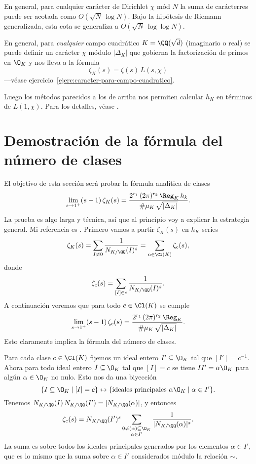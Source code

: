 \begin{comentario}
  En general, para cualquier carácter de Dirichlet $\chi$ mód $N$ la suma de
  carácterres puede ser acotada como $O (\sqrt{N}\,\log N)$. Bajo la hipótesis
  de Riemann generalizada, esta cota se generaliza a
  $O (\sqrt{N}\,\log\log N)$.
\end{comentario}

\begin{comentario}
  En general, para \emph{cualquier} campo cuadrático $K = \QQ (\sqrt{d})$
  (imaginario o real) se puede definir un carácter $\chi$ módulo $|\Delta_K|$
  que gobierna la factorización de primos en $\O_K$ y nos lleva a la fórmula
  $$\zeta_K (s) = \zeta (s) \, L (s,\chi)$$
  ---véase ejercicio~\ref{ejerc:caracter-para-campo-cuadratico}.

  Luego los métodos parecidos a los de arriba nos permiten calcular $h_K$
  en términos de $L (1,\chi)$. Para los detalles, véase
  \cite[Chapter~5]{Borevich-Shafarevich}.
\end{comentario}


\section{Demostración de la fórmula del número de clases}

El objetivo de esta sección será probar la fórmula analítica de clases
\[ \lim_{s \to 1^+} (s - 1)\,\zeta_K (s) =
   \frac{2^{r_1}\,(2\pi)^{r_2}\,\Reg_K\,h_k}{\#\mu_K\,\sqrt{|\Delta_K|}}. \]
La prueba es algo larga y técnica, así que al principio voy a explicar
la estrategia general. Mi referencia es \cite{Borevich-Shafarevich}.
Primero vamos a partir $\zeta_K (s)$ en $h_K$ series
$$\zeta_K (s) = \sum_{I\ne 0} \frac{1}{N_{K/\QQ} (I)^s} = \sum_{n\in \Cl (K)} \zeta_c (s),$$
donde
$$\zeta_c (s) = \sum_{[I] \in c} \frac{1}{N_{K/\QQ} (I)^s}.$$
A continuación veremos que para todo $c \in \Cl (K)$ se cumple
\[ \lim_{s \to 1^+} (s - 1)\,\zeta_c (s) =
   \frac{2^{r_1}\,(2\pi)^{r_2}\,\Reg_K}{\#\mu_K\,\sqrt{|\Delta_K|}}. \]
Esto claramente implica la fórmula del número de clases.

\vspace{1em}

Para cada clase $c \in \Cl (K)$ fijemos un ideal entero $I' \subseteq \O_K$
tal que $[I'] = c^{-1}$. Ahora para todo ideal entero $I \subseteq \O_K$ tal que
$[I] = c$ se tiene $I I' = \alpha \O_K$ para algún $\alpha \in \O_K$ no nulo.
Esto nos da una biyección
\[ \{ I \subseteq \O_K \mid [I] = c \} \leftrightarrow
\{ \text{ideales principales } \alpha\O_K \mid \alpha \in I' \}. \]
Tenemos $N_{K/\QQ} (I) \, N_{K/\QQ} (I') = |N_{K/\QQ} (\alpha)|$, y entonces
$$\zeta_c (s) = N_{K/\QQ} (I')^s \sum_{\substack{0 \ne (\alpha) \subseteq \O_K \\ \alpha \in I'}} \frac{1}{|N_{K/\QQ} (\alpha)|^s}.$$
La suma es sobre todos los ideales principales generados por los elementos
$\alpha \in I'$, que es lo mismo que la suma sobre $\alpha \in I'$ considerados
módulo la relación $\sim$.

